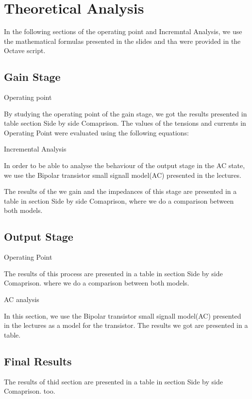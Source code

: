 \section{Theoretical Analysis}
\label{sec:analysis}

In the following sections of the operating point and Incremntal Analysis, we use the mathematical formulas presented in the slides
and tha were provided in the Octave script.

\subsection{Gain Stage}


Operating point

By studying the operating point of the gain stage, we got the results presented in table section Side by side Comaprison.
The values of the tensions and currents in Operating Point were evaluated using the following equations:


Incremental Analysis

In order to be able to analyse the behaviour of the output stage in the AC state, we use the Bipolar transistor small signall model(AC) presented in the lectures.

The results of the we gain and the impedances of this stage are presented in a table in section Side by side Comaprison, where we do a comparison between both models.



\subsection{Output Stage}

Operating Point

The results of this process are presented in a table in section Side by side Comaprison. where we do a comparison between both models.

AC analysis

In this section, we use the Bipolar transistor small signall model(AC) presented in the lectures as a model for the transistor.
The results we got are presented in a table.

\subsection{Final Results}

The results of thid section are presented in a table in section Side by side Comaprison. too.

